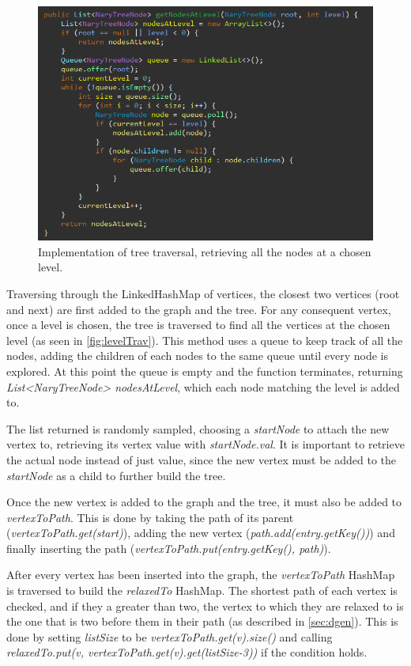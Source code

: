 \documentclass{l4proj}
\begin{document}
\begin{figure}
    \centering
    \includegraphics[width=0.7\linewidth]{images/levelTrav.png}    

    \caption{Implementation of tree traversal, retrieving all the nodes at a chosen level.}
    \label{fig:levelTrav} 
\end{figure}

Traversing through the LinkedHashMap of vertices, the closest two vertices (root and next) are first added to the graph and the tree. For any consequent vertex, once a level is chosen, the tree is traversed to find all the vertices at the chosen level (as seen in \autoref{fig:levelTrav}). This method uses a queue to keep track of all the nodes, adding the children of each nodes to the same queue until every node is explored. At this point the queue is empty and the function terminates, returning \emph{List<NaryTreeNode> nodesAtLevel}, which each node matching the level is added to.

The list returned is randomly sampled, choosing a \emph{startNode} to attach the new vertex to, retrieving its vertex value with \emph{startNode.val}. It is important to retrieve the actual node instead of just value, since the new vertex must be added to the \emph{startNode} as a child to further build the tree.

Once the new vertex is added to the graph and the tree, it must also be added to \emph{vertexToPath}. This is done by taking the path of its parent (\emph{vertexToPath.get(start)}), adding the new vertex (\emph{path.add(entry.getKey())}) and finally inserting the path (\emph{vertexToPath.put(entry.getKey(), path)}).

After every vertex has been inserted into the graph, the \emph{vertexToPath} HashMap is traversed to build the \emph{relaxedTo} HashMap. The shortest path of each vertex is checked, and if they a greater than two, the vertex to which they are relaxed to is the one that is two before them in their path (as described in \autoref{sec:dgen}). This is done by setting \emph{listSize} to be \emph{vertexToPath.get(v).size()} and calling \emph{relaxedTo.put(v, vertexToPath.get(v).get(listSize-3))} if the condition holds.
\end{document}
